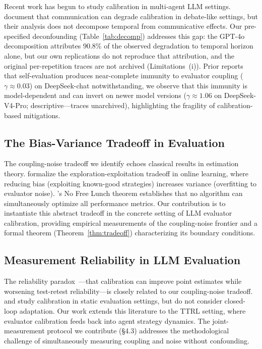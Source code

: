 \documentclass[11pt]{article}
\theoremstyle{definition}
\theoremstyle{remark}
\begin{document}
Recent work has begun to study calibration in multi-agent LLM settings. \citet{huang2026cagecal} document that communication can degrade calibration in debate-like settings, but their analysis does not decompose temporal from communicative effects. Our pre-specified deconfounding (Table~\ref{tab:decomp}) addresses this gap: the GPT-4o decomposition attributes 90.8\% of the observed degradation to temporal horizon alone, but our own replications do not reproduce that attribution, and the original per-repetition traces are not archived (Limitations~(i)). Prior reports that self-evaluation produces near-complete immunity to evaluator coupling ($\gamma{\approx}0.03$) on DeepSeek-chat notwithstanding, we observe that this immunity is model-dependent and can invert on newer model versions ($\gamma{\approx}1.06$ on DeepSeek-V4-Pro; descriptive---traces unarchived), highlighting the fragility of calibration-based mitigations.

\subsection{The Bias-Variance Tradeoff in Evaluation}

The coupling-noise tradeoff we identify echoes classical results in estimation theory. \citet{bubeck2012regret} formalize the exploration-exploitation tradeoff in online learning, where reducing bias (exploiting known-good strategies) increases variance (overfitting to evaluator noise). \citet{wolpert1997no}'s No Free Lunch theorem establishes that no algorithm can simultaneously optimize all performance metrics. Our contribution is to instantiate this abstract tradeoff in the concrete setting of LLM evaluator calibration, providing empirical measurements of the coupling-noise frontier and a formal theorem (Theorem~\ref{thm:tradeoff}) characterizing its boundary conditions.

\subsection{Measurement Reliability in LLM Evaluation}

The reliability paradox~\citep{messing2026tee}---that calibration can improve point estimates while worsening test-retest reliability---is closely related to our coupling-noise tradeoff. \citet{guo2017calibration} and \citet{tian2023calibration} study calibration in static evaluation settings, but do not consider closed-loop adaptation. Our work extends this literature to the TTRL setting, where evaluator calibration feeds back into agent strategy dynamics. The joint-measurement protocol we contribute (\S4.3) addresses the methodological challenge of simultaneously measuring coupling and noise without confounding.
\end{document}
